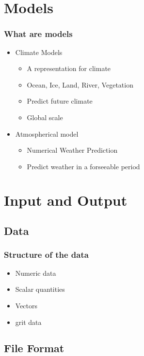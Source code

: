 \documentclass[compress]{beamer}
\begin{document}
\section{Models}
\begin{frame}
    \frametitle{What are models}

    \begin{itemize}
		\item Climate Models
		\begin{itemize}
			\item A representation for climate
			\item Ocean, Ice, Land, River, Vegetation
			\item Predict future climate
			\item Global scale
		\end{itemize}

		\item Atmospherical model
		\begin{itemize}
			\item Numerical Weather Prediction
			\item Predict weather in a forseeable period
		\end{itemize}
    \end{itemize}

\end{frame}


\section{Input and Output}
\subsection{Data}

\begin{frame}[fragile]
	\frametitle{Structure of the data}

		\begin{itemize}
		    \item Numeric data
			\item Scalar quantities
			\item Vectors
			\item grit data
		\end{itemize}

\end{frame}

\subsection{File Format}
\end{document}

